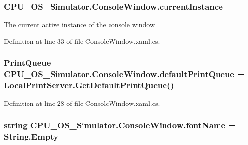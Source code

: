 \subsubsection[{current\+Instance}]{ C\+P\+U\+\_\+\+O\+S\+\_\+\+Simulator.\+Console\+Window.\+current\+Instance\hspace{0.3cm}{\ttfamily [static]}}\label{class_c_p_u___o_s___simulator_1_1_console_window_abee2fd1e118dd4f81dc2142bc033da4a}


The current active instance of the console window 



Definition at line 33 of file Console\+Window.\+xaml.\+cs.

\hypertarget{class_c_p_u___o_s___simulator_1_1_console_window_adec14e0c1003b5d40bb517cf834d6584}{}
\subsubsection[{default\+Print\+Queue}]{\setlength{\rightskip}{0pt plus 5cm}Print\+Queue C\+P\+U\+\_\+\+O\+S\+\_\+\+Simulator.\+Console\+Window.\+default\+Print\+Queue = Local\+Print\+Server.\+Get\+Default\+Print\+Queue()\hspace{0.3cm}{\ttfamily [private]}}\label{class_c_p_u___o_s___simulator_1_1_console_window_adec14e0c1003b5d40bb517cf834d6584}


Definition at line 28 of file Console\+Window.\+xaml.\+cs.

\hypertarget{class_c_p_u___o_s___simulator_1_1_console_window_a78375ad950278e847c76e7de38aa1e31}{}
\subsubsection[{font\+Name}]{\setlength{\rightskip}{0pt plus 5cm}string C\+P\+U\+\_\+\+O\+S\+\_\+\+Simulator.\+Console\+Window.\+font\+Name = String.\+Empty\hspace{0.3cm}{\ttfamily [private]}}\label{class_c_p_u___o_s___simulator_1_1_console_window_a78375ad950278e847c76e7de38aa1e31}


